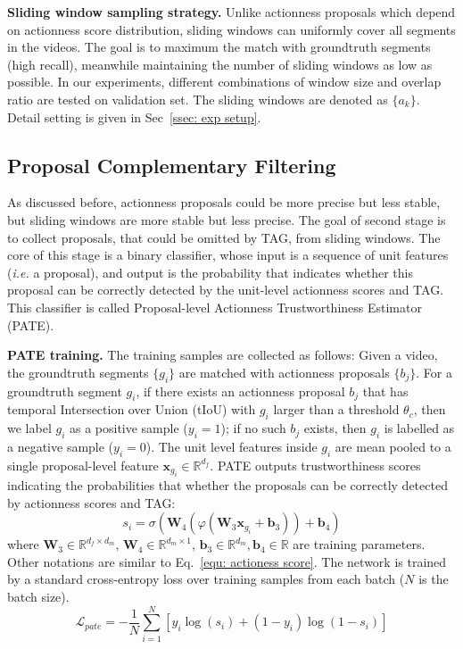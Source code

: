 \documentclass[runningheads]{llncs}
\begin{document}
\textbf{Sliding window sampling strategy.} Unlike actionness proposals which depend on actionness score distribution, sliding windows can uniformly cover all segments in the videos. The goal is to maximum the match with groundtruth segments (high recall), meanwhile maintaining the number of sliding windows as low as possible. In our experiments, different combinations of window size and overlap ratio are tested on validation set. The sliding windows are denoted as $\{a_k\}$. Detail setting is given in Sec~\ref{ssec: exp setup}.

\subsection{Proposal Complementary Filtering}

As discussed before, actionness proposals could be more precise but less stable, but sliding windows are more stable but less precise. The goal of second stage is to collect proposals, that could be omitted by TAG, from sliding windows. The core of this stage is a binary classifier, whose input is a sequence of unit features (\emph{i.e.} a proposal), and output is the probability that indicates whether this proposal can be correctly detected by the unit-level actionness scores and TAG. This classifier is called Proposal-level Actionness Trustworthiness Estimator (PATE).

\textbf{PATE training.} The training samples are collected as follows: Given a video, the groundtruth segments $\{g_i\}$ are matched with actionness proposals $\{b_j\}$. For a groundtruth segment $g_i$, if there exists an actionness proposal $b_j$ that has temporal Intersection over Union (tIoU) with $g_i$ larger than a threshold $\theta_c$, then we label $g_i$ as a positive sample ($y_i=1$); if no such $b_j$ exists, then $g_i$ is labelled as a negative sample ($y_i=0$). 
The unit level features inside $g_i$ are mean pooled to a single proposal-level feature $\mathbf{x}_{g_i}\in\mathbb{R}^{d_f}$. 
PATE outputs trustworthiness scores indicating the probabilities that whether the proposals can be correctly detected by actionness scores and TAG:
\begin{equation}\label{equ: pate score}
s_i = \sigma\left(\mathbf{W}_4(\varphi(\mathbf{W}_3\mathbf{x}_{g_i}+\mathbf{b}_3))+\mathbf{b}_4\right)
\end{equation}
where $\mathbf{W}_3\in\mathbb{R}^{d_f\times d_m}$, $\mathbf{W}_4\in\mathbb{R}^{d_m\times1}$, $\mathbf{b}_3\in\mathbb{R}^{d_m}, \mathbf{b}_4\in\mathbb{R}$ are training parameters. Other notations are similar to Eq.~\ref{equ: actioness score}. 
The network is trained by a standard cross-entropy loss over training samples from each batch ($N$ is the batch size).
\begin{equation}\label{equ: obj pate}
\mathcal{L}_{pate} = -\frac{1}{N}\sum_{i=1}^N\left[y_i\log(s_i)+(1-y_i)\log(1-s_i)\right]
\end{equation}
\end{document}
